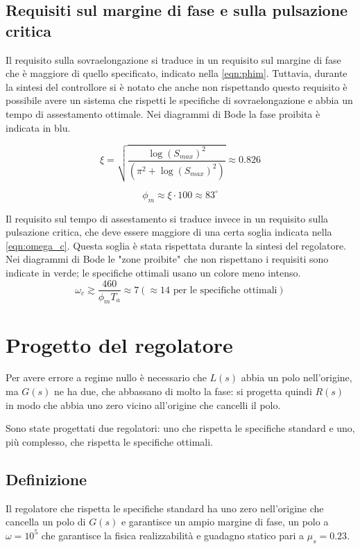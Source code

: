 \documentclass[a4paper]{article}
\begin{document}
\subsection{Requisiti sul margine di fase e sulla pulsazione critica}
Il requisito sulla sovraelongazione si traduce in un requisito sul margine di fase che è maggiore di quello specificato, indicato nella \cref{eqn:phim}.
Tuttavia, durante la sintesi del controllore si è notato che anche non rispettando questo requisito è possibile avere un sistema che rispetti le specifiche di sovraelongazione e abbia un tempo di assestamento ottimale.
Nei diagrammi di Bode la fase proibita è indicata in blu.

\begin{equation}
    \xi = \sqrt{\frac{\log(S_{max})^2}{(\pi^2+\log(S_{max})^2)}} \approx 0.826
    \label{eqn:xi}
\end{equation}

\begin{equation}
    \phi_m \approx \xi \cdot 100 \approx 83^\circ
    \label{eqn:phim}
\end{equation}

Il requisito sul tempo di assestamento si traduce invece in un requisito sulla pulsazione critica, che deve essere maggiore di una certa soglia indicata nella \cref{eqn:omega_c}.
Questa soglia è stata rispettata durante la sintesi del regolatore. 
Nei diagrammi di Bode le "zone proibite" che non rispettano i requisiti sono indicate in verde; le specifiche ottimali usano un colore meno intenso.
\begin{equation}
    \omega_c \gtrsim \frac{460}{\phi_m T_a} \approx 7 (\approx 14 \textrm{ per le specifiche ottimali})
    \label{eqn:omega_c}
\end{equation}

\section{Progetto del regolatore}

Per avere errore a regime nullo è necessario che $L(s)$ abbia un polo nell'origine, ma $G(s)$ ne ha due, che abbassano di molto la fase: si progetta quindi $R(s)$ in modo che abbia uno zero vicino all'origine che cancelli il polo.

Sono state progettati due regolatori: uno che rispetta le specifiche standard e uno, più complesso, che rispetta le specifiche ottimali.

\subsection{Definizione}
Il regolatore che rispetta le specifiche standard ha uno zero nell'origine che cancella un polo di $G(s)$ e garantisce un ampio margine di fase, un polo a $\omega = 10^5$ che garantisce la fisica realizzabilità e guadagno statico pari a $\mu_s = 0.23$.
\end{document}

